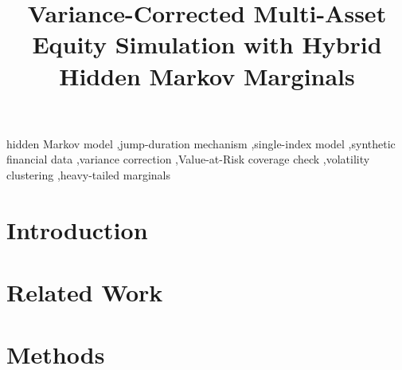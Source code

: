 \documentclass[preprint,authoryear,doubleblind]{elsarticle}
\begin{document}
\begin{frontmatter}
\title{Variance-Corrected Multi-Asset Equity Simulation with Hybrid Hidden Markov Marginals}
\begin{abstract}

\end{abstract}
\begin{keyword}
hidden Markov model \sep jump-duration mechanism \sep single-index model
\sep synthetic financial data \sep variance correction
\sep Value-at-Risk coverage check \sep volatility clustering
\sep heavy-tailed marginals
\end{keyword}
\end{frontmatter}

\section{Introduction}\label{sec:introduction}


\section{Related Work}\label{sec:related-work}


\section{Methods}\label{sec:method}
\end{document}
